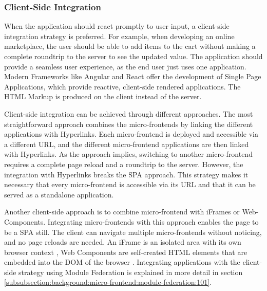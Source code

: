 \subsubsection{Client-Side Integration}\label{subsubsection:background:micro-frontend-architecture:integration-strategies:client-side-integration}

When the application should react promptly to user input, a client-side integration strategy is preferred. For example, when developing an online marketplace, the user should be able to add items to the cart without making a complete roundtrip to the server to see the updated value. The application should provide a seamless user experience, as the end user just uses one application. Modern Frameworks like Angular and React offer the development of Single Page Applications, which provide reactive, client-side rendered applications. The \ac{HTML} Markup is produced on the client instead of the server. \cite{book:2020:geers:background:micro-frontends:micro-frontends-in-action}

\bigskip

\noindent Client-side integration can be achieved through different approaches. The most straightforward approach combines the micro-frontends by linking the different applications with Hyperlinks. Each micro-frontend is deployed and accessible via a different \ac{URL}, and the different micro-frontend applications are then linked with Hyperlinks. As the approach implies, switching to another micro-frontend requires a complete page reload and a roundtrip to the server. However, the integration with Hyperlinks breaks the \ac{SPA} approach. This strategy makes it necessary that every micro-frontend is accessible via its \ac{URL} and that it can be served as a standalone application.

\bigskip

\noindent Another client-side approach is to combine micro-frontend with iFrames or Web-Components. Integrating micro-frontends with this approach enables the page to be a \ac{SPA} still. The client can navigate multiple micro-frontends without noticing, and no page reloads are needed. An iFrame is an isolated area with its own browser context \cite[35]{book:2020:geers:background:micro-frontends:micro-frontends-in-action}, Web Components are self-created \ac{HTML} elements that are embedded into the DOM of the browser \cite[103]{book:2019:farrell:background:micro-frontends:web-components-in-action}. Integrating applications with the client-side strategy using Module Federation is explained in more detail in section \ref{subsubsection:background:micro-frontend:module-federation:101}.
